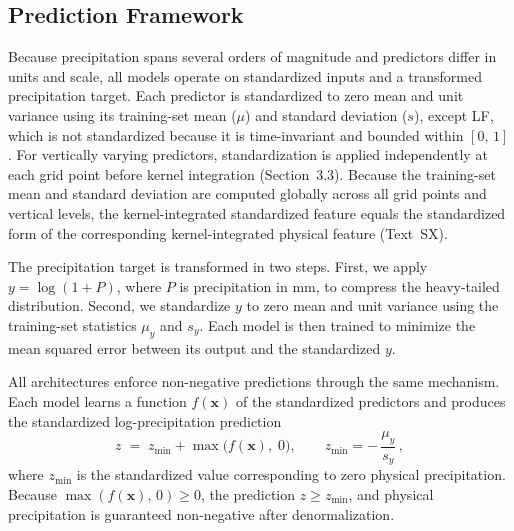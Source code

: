 
\subsection{Prediction Framework}

Because precipitation spans several orders of magnitude and predictors differ
in units and scale, all models operate on standardized inputs and a transformed
precipitation target. Each predictor is standardized to zero mean and unit
variance using its training-set mean ($\mu$) and standard deviation ($s$),
except LF, which is not standardized because it is time-invariant and bounded
within $[0,\,1]$. For vertically varying predictors, standardization is applied
independently at each grid point before kernel integration (Section~3.3).
Because the training-set mean and standard deviation are computed globally
across all grid points and vertical levels, the kernel-integrated standardized
feature equals the standardized form of the corresponding kernel-integrated
physical feature (Text~SX).

The precipitation target is transformed in two steps. First, we apply $y =
\log(1 + P)$, where $P$ is precipitation in mm, to compress the heavy-tailed
distribution. Second, we standardize $y$ to zero mean and unit variance using
the training-set statistics $\mu_y$ and $s_y$. Each model is then trained to
minimize the mean squared error between its output and the standardized $y$.

All architectures enforce non-negative predictions through the same mechanism.
Each model learns a function $f(\mathbf{x})$ of the standardized predictors and
produces the standardized log-precipitation prediction
%
\begin{equation}
  z \;=\; z_{\min} + \max\!\bigl(f(\mathbf{x}),\;0\bigr),
  \qquad
  z_{\min} = -\,\frac{\mu_y}{s_y}\,,
  \label{eq:zfloor}
\end{equation}
%
where $z_{\min}$ is the standardized value corresponding to zero physical
precipitation. Because $\max(f(\mathbf{x}),\,0) \geq 0$, the prediction
$z \geq z_{\min}$, and physical precipitation is guaranteed non-negative after
denormalization.

